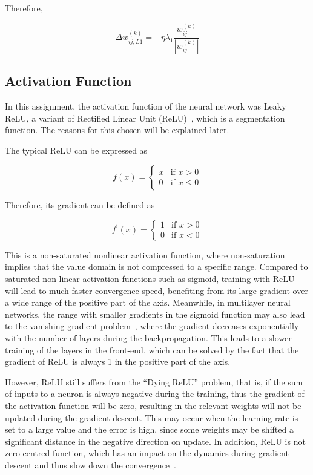 \documentclass[conference]{IEEEtran}
\begin{document}
Therefore,

\begin{equation}
    \Delta w_{ij,L1}^{(k)} = -\eta\lambda_1\frac{w_{ij}^{(k)}}{\left|w_{ij}^{(k)}\right|}
\end{equation}

\subsection{Activation Function}

In this assignment, the activation function of the neural network was Leaky ReLU, a variant of Rectified Linear Unit (ReLU)~\cite{krizhevsky2012imagenet}, which is a segmentation function. The reasons for this chosen will be explained later.

The typical ReLU can be expressed as

\begin{equation}
    f(x)=
    \begin{cases}
        x& \text{if }x>0\\
        0& \text{if }x\leq0
    \end{cases}
\end{equation}

Therefore, its gradient can be defined as

\begin{equation}
    f^{'}(x)=
    \begin{cases}
        1& \text{if }x>0\\
        0& \text{if }x<0
    \end{cases}
\end{equation}

This is a non-saturated nonlinear activation function, where non-saturation implies that the value domain is not compressed to a specific range. Compared to saturated non-linear activation functions such as sigmoid, training with ReLU will lead to much faster convergence speed, benefiting from its large gradient over a wide range of the positive part of the axis. Meanwhile, in multilayer neural networks, the range with smaller gradients in the sigmoid function may also lead to the vanishing gradient problem~\cite{hochreiter2001gradient}, where the gradient decreases exponentially with the number of layers during the backpropagation. This leads to a slower training of the layers in the front-end, which can be solved by the fact that the gradient of ReLU is always 1 in the positive part of the axis.

However, ReLU still suffers from the ``Dying ReLU'' problem, that is, if the sum of inputs to a neuron is always negative during the training, thus the gradient of the activation function will be zero, resulting in the relevant weights will not be updated during the gradient descent. This may occur when the learning rate is set to a large value and the error is high, since some weights may be shifted a significant distance in the negative direction on update. In addition, ReLU is not zero-centred function, which has an impact on the dynamics during gradient descent and thus slow down the convergence~\cite{deep2021}.
\end{document}
